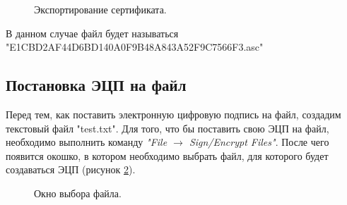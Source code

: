 \documentclass[10pt,a4paper]{report}
\begin{document}
\begin{figure}[h]
	\caption{Экспортирование сертификата.}
	\label{ris:step21}
\end{figure}

В данном случае файл будет называться\\"E1CBD2AF44D6BD140A0F9B48A843A52F9C7566F3.asc"

\subsection{Постановка ЭЦП на файл}
Перед тем, как поставить электронную цифровую подпись на файл, создадим текстовый файл "test.txt". Для того, что бы поставить свою ЭЦП на файл, необходимо выполнить команду \textit{"File \begin{math}\to\end{math} Sign/Encrypt Files"}. После чего появится окошко, в котором необходимо выбрать файл, для которого будет создаваться ЭЦП (рисунок \ref{ris:step31}).

\begin{figure}[h]
	\caption{Окно выбора файла.}
	\label{ris:step31}
\end{figure}
\end{document}
